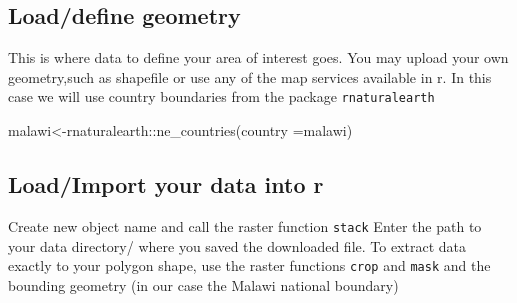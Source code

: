 \documentclass[
]{book}
\newenvironment{Shaded}{\begin{snugshade}}{\end{snugshade}}
\newcommand{\AttributeTok}[1]{\textcolor[rgb]{0.77,0.63,0.00}{#1}}
\newcommand{\FunctionTok}[1]{\textcolor[rgb]{0.00,0.00,0.00}{#1}}
\newcommand{\NormalTok}[1]{#1}
\newcommand{\OtherTok}[1]{\textcolor[rgb]{0.56,0.35,0.01}{#1}}
\newcommand{\SpecialCharTok}[1]{\textcolor[rgb]{0.00,0.00,0.00}{#1}}
\newcommand{\StringTok}[1]{\textcolor[rgb]{0.31,0.60,0.02}{#1}}
\begin{document}
\hypertarget{loaddefine-geometry}{%
\subsection{Load/define geometry}\label{loaddefine-geometry}}

This is where data to define your area of interest goes.
You may upload your own geometry,such as shapefile or use any of the map services available in r. In this case we will use country boundaries from the package \texttt{rnaturalearth}

\begin{Shaded}
\begin{Highlighting}[]
\NormalTok{malawi}\OtherTok{\textless{}{-}}\NormalTok{rnaturalearth}\SpecialCharTok{::}\FunctionTok{ne\_countries}\NormalTok{(}\AttributeTok{country =}\StringTok{\textquotesingle{}malawi\textquotesingle{}}\NormalTok{)}
\end{Highlighting}
\end{Shaded}

\hypertarget{loadimport-your-data-into-r}{%
\subsection{Load/Import your data into r}\label{loadimport-your-data-into-r}}

Create new object name and call the raster function \texttt{stack}
Enter the path to your data directory/ where you saved the downloaded file.
To extract data exactly to your polygon shape, use the raster functions \texttt{crop} and \texttt{mask} and the bounding geometry (in our case the Malawi national boundary)
\end{document}
